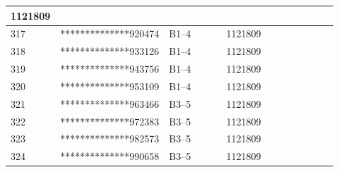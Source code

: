 \documentclass[UTF8,10pt,a4paper,fontset=fandol]{ctexart}
\newcommand{\fieldvalue}[1]{#1}
\begin{document}
\begin{tabular}{|p{0.08\linewidth}|p{0.28\linewidth}|p{0.19\linewidth}|p{0.19\linewidth}|p{0.18\linewidth}|}
\fieldvalue{1121809} & \\ \hline
317 &
\fieldvalue{**************920474} &
\fieldvalue{B1--4} &
\fieldvalue{1121809} & \\ \hline
318 &
\fieldvalue{**************933126} &
\fieldvalue{B1--4} &
\fieldvalue{1121809} & \\ \hline
319 &
\fieldvalue{**************943756} &
\fieldvalue{B1--4} &
\fieldvalue{1121809} & \\ \hline
320 &
\fieldvalue{**************953109} &
\fieldvalue{B1--4} &
\fieldvalue{1121809} & \\ \hline
321 &
\fieldvalue{**************963466} &
\fieldvalue{B3--5} &
\fieldvalue{1121809} & \\ \hline
322 &
\fieldvalue{**************972383} &
\fieldvalue{B3--5} &
\fieldvalue{1121809} & \\ \hline
323 &
\fieldvalue{**************982573} &
\fieldvalue{B3--5} &
\fieldvalue{1121809} & \\ \hline
324 &
\fieldvalue{**************990658} &
\fieldvalue{B3--5} &
\fieldvalue{1121809} & \\ \hline

\end{tabular}
\end{document}
